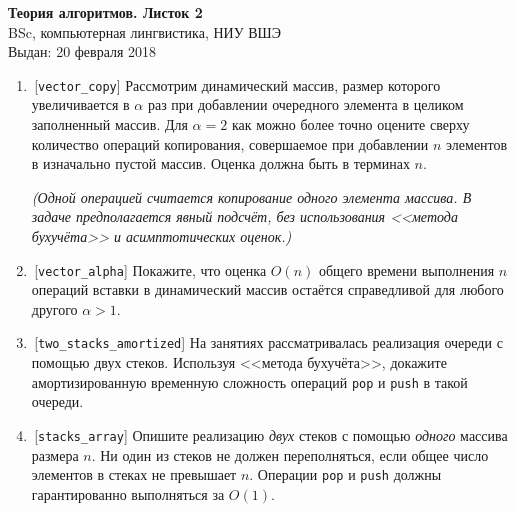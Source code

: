 \documentclass[12pt,a4paper]{report}
\begin{document}
\begin{center}
\textbf{\large{Теория алгоритмов. Листок 2}}\\
BSc, компьютерная лингвистика, НИУ ВШЭ\\
Выдан: 20 февраля 2018\\
\end{center}

\begin{enumerate}
  \item\,[{\tt vector\_copy}] Рассмотрим динамический массив, размер которого увеличивается в $\alpha$ раз при добавлении очередного элемента в целиком заполненный массив. Для $\alpha=2$ как можно более точно оцените сверху количество операций копирования, совершаемое при добавлении $n$ элементов в изначально пустой массив. Оценка должна быть в терминах $n$.

  {\it (Одной операцией считается копирование одного элемента массива. В задаче предполагается явный подсчёт, без использования <<метода бухучёта>> и асимптотических оценок.)}

  \item\,[{\tt vector\_alpha}] Покажите, что оценка $O(n)$ общего времени выполнения $n$ операций вставки в динамический массив остаётся справедливой для любого другого $\alpha > 1$.

  \item\,[{\tt two\_stacks\_amortized}] На занятиях рассматривалась реализация очереди с помощью двух стеков. Используя <<метода бухучёта>>, докажите амортизированную временную сложность операций {\tt pop} и {\tt push} в такой очереди.

  \item\,[{\tt stacks\_array}] Опишите реализацию {\em двух} стеков с помощью {\em одного} массива размера $n$. Ни один из стеков не должен переполняться, если общее число элементов в стеках не превышает $n$. Операции {\tt pop} и {\tt push} должны гарантированно выполняться за $O(1)$.
\end{enumerate}
\end{document}
